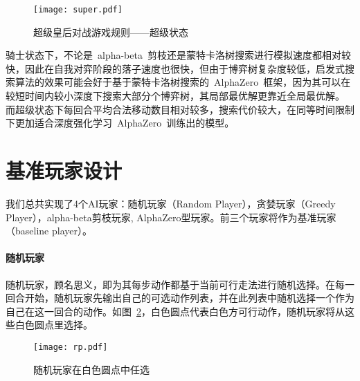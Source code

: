 \begin{figure}[htb]
    \centering
    \texttt{[image: super.pdf]}
    \caption[rules-super]{%
        超级皇后对战游戏规则——超级状态%
      }
    \label{fig:super}
\end{figure}
骑士状态下，不论是~alpha-beta~剪枝还是蒙特卡洛树搜索进行模拟速度都相对较快，因此在自我对弈阶段的落子速度也很快，但由于博弈树复杂度较低，启发式搜索算法的效果可能会好于基于蒙特卡洛树搜索的~AlphaZero~框架，因为其可以在较短时间内较小深度下搜索大部分个博弈树，其局部最优解更靠近全局最优解。
而超级状态下每回合平均合法移动数目相对较多，搜索代价较大，在同等时间限制下更加适合深度强化学习~AlphaZero~训练出的模型。

\section{基准玩家设计}
我们总共实现了4个AI玩家：随机玩家（Random Player），贪婪玩家（Greedy Player），alpha-beta剪枝玩家, AlphaZero型玩家。前三个玩家将作为基准玩家（baseline player）。
\paragraph{随机玩家}
随机玩家，顾名思义，即为其每步动作都基于当前可行走法进行随机选择。在每一回合开始，随机玩家先输出自己的可选动作列表，并在此列表中随机选择一个作为自己在这一回合的动作。如图~\ref{fig:super}，白色圆点代表白色方可行动作，随机玩家将从这些白色圆点里选择。
\begin{figure}[htb]
    \centering
    \texttt{[image: rp.pdf]}
    \caption[rp]{%
        随机玩家在白色圆点中任选%
      }
    \label{fig:super}
\end{figure}
